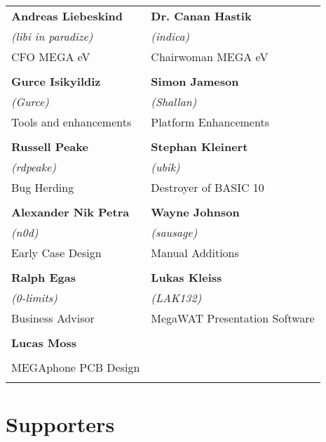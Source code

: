 \setlength{\tabcolsep}{1mm}
\begin{tabular}{p{6cm}p{6cm}}

{\large\bf Andreas Liebeskind}     & {\large\bf Dr. Canan Hastik} \\
 \textit{(libi in paradize)}       & \textit{(indica)} \\
CFO MEGA eV                        & Chairwoman MEGA eV \\
& \\
{\large\bf Gurce Isikyildiz}       & {\large\bf Simon Jameson} \\
 \textit{(Gurce)}                  &  \textit{(Shallan)} \\
Tools and enhancements             & Platform Enhancements \\
& \\
{\large\bf Russell Peake}          & {\large\bf Stephan Kleinert} \\
  \textit{(rdpeake)}               & \textit{(ubik)}        \\
Bug Herding                        & Destroyer of BASIC 10     \\
& \\
{\large\bf Alexander Nik Petra}    & {\large\bf Wayne Johnson} \\
 \textit{(n0d)}                    &  \textit{(sausage)} \\
Early Case Design                  & Manual Additions \\
& \\
{\large\bf Ralph Egas}             & {\large\bf Lukas Kleiss} \\
 \textit{(0-limits)}               & \textit{(LAK132)} \\
Business Advisor                   & MegaWAT Presentation Software \\
& \\
{\large\bf Lucas Moss}             &                           \\
                                   &                    \\
MEGAphone PCB Design               &                       \\
& \\
\end{tabular}

\newpage
\section{Supporters}

